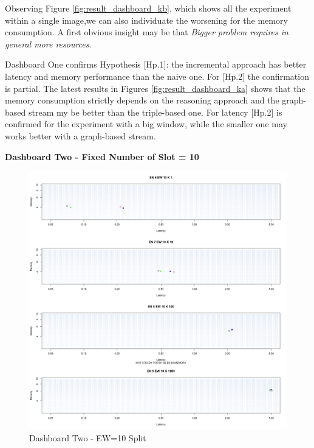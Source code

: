 Observing Figure \ref{fig:result_dashboard_kb}, which shows all the experiment within a single image,we can also individuate the worsening for the memory consumption. A first obvious insight may be that \textit{Bigger problem requires in general more resources}. %

Dashboard One confirms Hypothesis [Hp.1]: the incremental approach has better latency and memory performance than the naive one. For [Hp.2] the confirmation is partial. The latest results in Figures \ref{fig:result_dashboard_ka} shows that the memory consumption strictly depends on the reasoning approach and the graph-based stream my be better than the triple-based one. For latency [Hp.2] is confirmed for the experiment with a big window, while the smaller one may works better with a graph-based stream.


\textbf{Dashboard Two - Fixed Number of Slot = 10}


\begin{figure}[htb]
	\centering
	\includegraphics[width=0.90\linewidth]{images/dashboard-2-split}	
	\caption{Dashboard Two - EW=10 Split} 
	\label{fig:result_dashboard_ewa}
\end{figure}

